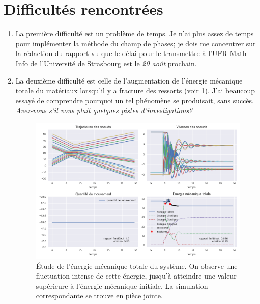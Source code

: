 \documentclass[
  french,
	11pt, %
]{fphw}
\begin{document}
 

\section*{Difficultés rencontrées}


\begin{enumerate}
  \item La première difficulté est un problème de temps. Je n'ai plus assez de temps pour implémenter la méthode du champ de phases; je dois me concentrer sur la rédaction du rapport vu que le délai pour le transmettre à l'UFR Math-Info de l'Université de Strasbourg est le \emph{20 août} prochain.
  \item La deuxième difficulté est celle de l'augmentation de l'énergie mécanique totale du matériaux lorsqu'il y a fracture des ressorts (voir \cref{fig:energietot}). J'ai beaucoup essayé de comprendre pourquoi un tel phénomène se produisait, sans succès. \emph{Avez-vous s'il vous plait quelques pistes d'investigations?}
  \begin{figure}
    \centering
    \includegraphics[width=.85\textwidth]{EnergieTotFrac.png}
    \caption{Étude de l'énergie mécanique totale du système. On observe une fluctuation intense de cette énergie, jusqu'à atteindre une valeur supérieure à l'énergie mécanique initiale. La simulation correspondante se trouve en pièce jointe.}
    \label{fig:energietot}
  \end{figure}
\end{enumerate} 
\end{document}
